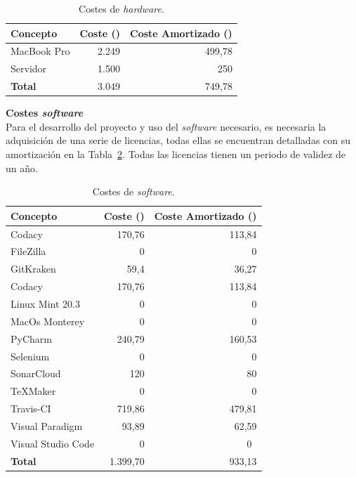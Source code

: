 \begin{table}[H]
\centering
\begin{tabular}{lrr}
	\toprule
	\textbf{Concepto} & \textbf{Coste (\officialeuro)} & \textbf{Coste Amortizado (\officialeuro)}\\
	\midrule
	MacBook Pro & 2.249 & 499,78\\
	Servidor & 1.500 & 250 \\
	\midrule
	\textbf{Total} & 3.049 & 749,78 \\
	\bottomrule
\end{tabular}
\caption{Costes de \emph{hardware}.}\label{tab:costes-hardware}
\end{table}

\textbf{Costes \textit{software}}\\
Para el desarrollo del proyecto y uso del \textit{software} necesario, es necesaria la adquisición de una serie de licencias, todas ellas se encuentran detalladas con su amortización en la Tabla~\ref{tab:costes-software}. Todas las licencias tienen un periodo de validez de un año.

\begin{table}[H]
\centering
\begin{tabular}{lrr}
	\toprule
	\textbf{Concepto} & \textbf{Coste (\officialeuro)} & \textbf{Coste Amortizado (\officialeuro)}\\
	\midrule
	Codacy & 170,76 & 113,84\\
	FileZilla & 0 & 0 \\
	GitKraken & 59,4& 36,27 \\
	Codacy & 170,76 & 113,84 \\
	Linux Mint 20.3 & 0 & 0 \\
	MacOs Monterey & 0 & 0 \\
	PyCharm & 240,79 & 160,53 \\
	Selenium & 0 & 0 \\
	SonarCloud & 120 & 80 \\
	\TeX Maker & 0 & 0 \\
	Travis-CI & 719,86 & 479,81 \\
	Visual Paradigm & 93,89 & 62,59 \\
	Visual Studio Code & 0 & 0~\\
	\midrule
	\textbf{Total} & 1.399,70 & 933,13 \\
	\bottomrule
\end{tabular}
\caption{Costes de \emph{software}.}\label{tab:costes-software}
\end{table}

